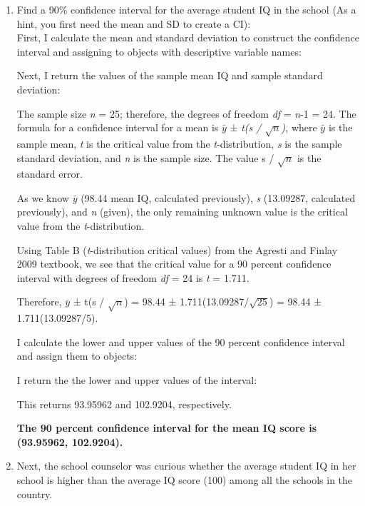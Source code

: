\documentclass[12pt,letterpaper]{article}
\begin{document}
	\begin{enumerate}
		\item Find a 90\% confidence interval for the average student IQ in the school (As a hint, you first need the mean and SD to create a CI):\\
		
		First, I calculate the mean and standard deviation to construct the confidence interval and assigning to objects with descriptive variable names:
		
		
		Next, I return the values of the sample mean IQ and sample standard deviation:
		

		
		The sample size \textit{n} = 25; therefore, the degrees of freedom \textit{df} = \textit{n}-1 = 24. The formula for a confidence interval for a mean is $\bar{y}$ ± \textit{t(s / $\sqrt{n}$)}, where $\bar{y}$ is the sample mean, \textit{t} is the critical value from the  \textit{t}-distribution, \textit{s} is the sample standard deviation, and \textit{n} is the sample size. The value s / $\sqrt{n}$ is the standard error.
		
		As we know $\bar{y}$ (98.44 mean IQ, calculated previously), \textit{s} (13.09287, calculated previously), and \textit{n} (given), the only remaining unknown value is the critical value from the \textit{t}-distribution. 
		
		Using Table B (\textit{t}-distribution critical values) from the Agresti and Finlay 2009 textbook, we see that the critical value for a 90 percent confidence interval with degrees of freedom \textit{df} = 24 is \textit{t} = 1.711.
		
		Therefore, $\bar{y}$ ± t(s / $\sqrt{n}$) = 98.44 ± 1.711(13.09287/$\sqrt{25}$)
		= 98.44 ± 1.711(13.09287/5).
		
		I calculate the lower and upper values of the 90 percent confidence interval and assign them to objects: 
		
		
		I return the the lower and upper values of the interval:
		
		
		This returns 93.95962 and 102.9204, respectively.
		
		\textbf{The 90 percent confidence interval for the mean IQ score is (93.95962, 102.9204).}
		
		\item Next, the school counselor was curious  whether  the average student IQ in her school is higher than the average IQ score (100) among all the schools in the country.\\ 
		

\end{enumerate}
\end{document}
